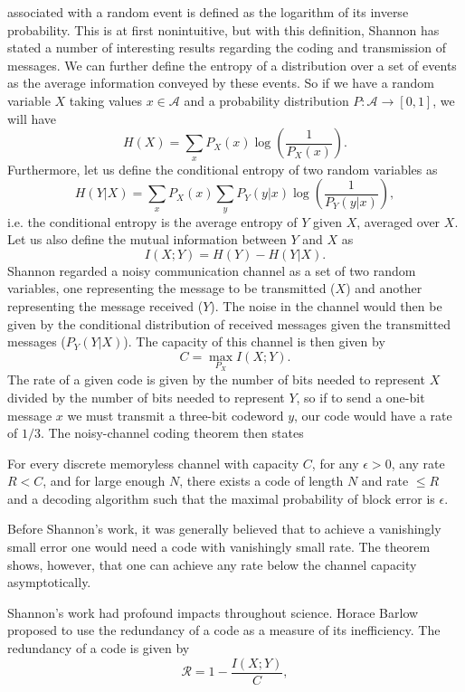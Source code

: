  associated with a random event is defined as the logarithm of its inverse probability. This is at first nonintuitive, but with this definition, Shannon \cite{Shannon1948} has stated a number of interesting results regarding the coding and transmission of messages. We can further define the entropy of a distribution over a set of events as the average information conveyed by these events. So if we have a random variable $X$ taking values $x \in \mathcal{A}$ and a probability distribution $P : \mathcal{A} \to [0,1]$, we will have
$$
H(X)= \sum_x P_X(x) \log\left(\frac{1}{P_X(x)}\right).
$$
Furthermore, let us define the conditional entropy of two random variables as
$$
H(Y|X) = \sum_x P_X(x) \sum_y P_Y(y|x) \log\left(\frac{1}{P_Y(y|x)}\right),
$$
i.e. the conditional entropy is the average entropy of $Y$ given $X$, averaged over $X$. Let us also define the mutual information between $Y$ and $X$ as
$$
I(X;Y) = H(Y) - H(Y|X).
$$
Shannon regarded a noisy communication channel as a set of two random variables, one representing the message to be transmitted ($X$) and another representing the message received ($Y$). The noise in the channel would then be given by the conditional distribution of received messages given the transmitted messages ($P_Y(Y|X)$). The capacity of this channel is then given by
$$
C = \max_{P_X} I(X;Y).
$$
The rate of a given code is given by the number of bits needed to represent $X$ divided by the number of bits needed to represent $Y$, so if to send a one-bit message $x$ we must transmit a three-bit codeword $y$, our code would have a rate of $1/3$.
The noisy-channel coding theorem\cite{mackay2003information} then states
\begin{noisychannel}
\label{thm:noisychannel}
For every discrete memoryless channel with capacity $C$, for any $\epsilon>0$, any rate $R<C$, and for large enough $N$, there exists a code of length $N$ and rate $\leq R$ and a decoding algorithm such that the maximal probability of block error is $\epsilon$.
\end{noisychannel}
Before Shannon's work, it was generally believed that to achieve a vanishingly small error one would need a code with vanishingly small rate. The theorem shows, however, that one can achieve any rate below the channel capacity asymptotically.\par
Shannon's work had profound impacts throughout science. Horace Barlow proposed to use the redundancy of a code as a measure of its inefficiency. The redundancy of a code is given by
$$
\mathcal{R} = 1 - \frac{I(X;Y)}{C},
$$
